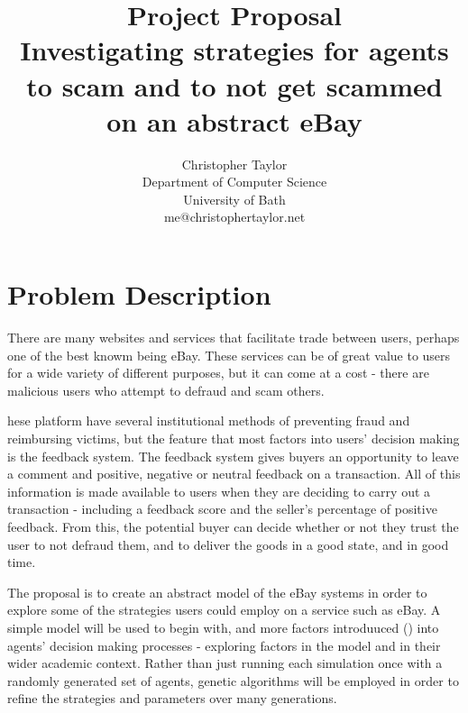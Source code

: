 \documentclass{article}
\title{Project Proposal \\ Investigating strategies for agents to scam and to not get scammed on an abstract eBay}
\author{Christopher Taylor \\ Department of Computer Science \\ University of Bath \\ me@christophertaylor.net}
\begin{document}
\maketitle

\section{Problem Description}
\label{sec:problem-description}
There are many websites and services that facilitate trade between users, perhaps one of the best knowm being eBay. These services can be of great value to users for a wide variety of different purposes, but it can come at a cost - there are malicious users who attempt to defraud and scam others.

hese platform have several institutional methods of preventing fraud and reimbursing victims, but the feature that most factors into users' decision making is the feedback system. The feedback system gives buyers an opportunity to leave a comment and positive, negative or neutral feedback on a transaction. All of this information is made available to users when they are deciding to carry out a transaction - including a feedback score and the seller's percentage of positive feedback. From this, the potential buyer can decide whether or not they trust the user to not defraud them, and to deliver the goods in a good state, and in good time.\cite{gregg2006role}

The proposal is to create an abstract model of the eBay systems in order to explore some of the strategies users could employ on a service such as eBay. A simple model will be used to begin with, and more factors introduuced () into agents' decision making processes - exploring factors in the model and in their wider academic context. Rather than just running each simulation once with a randomly generated set of agents, genetic algorithms will be employed in order to refine the strategies and parameters over many generations.
\end{document}
